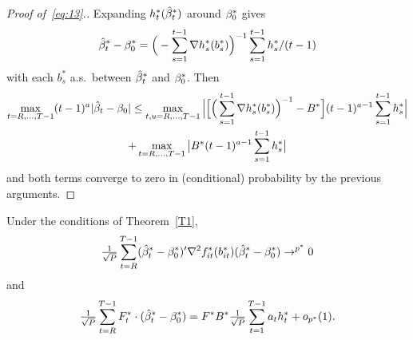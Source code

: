 \documentclass[12pt,fleqn]{article}
\begin{document}
\begin{proof}[Proof of~\eqref{eq:13}.]
Expanding $h_t^*(\hat \beta_t^*)$ around $\beta_0^*$ gives
\begin{equation*}
\hat \beta_t^* - \beta_0^* = \Big(- \sum_{s=1}^{t-1} \nabla h_s^*(b_s^*) \Big)^{-1} \sum_{s=1}^{t-1} h_s^* / (t-1)
\end{equation*}
with each $b_s^*$ a.s.\ between $\hat \beta_t^*$ and $\beta_0^*$. Then
\begin{multline}
  \max_{t=R,\dots,T-1} (t-1)^a | \hat{\beta}_t - \beta_0 |
  \leq
  \max_{t,u=R,\dots,T-1} \Big|\Big[ \Big(\sum_{s=1}^{t-1} \nabla h_s^*(b_s^*) \Big)^{-1} - B^* \Big]
  (t-1)^{a-1} \sum_{s=1}^{t-1} h_s^* \Big|\\
  + \max_{t=R,\dots,T-1} \big| B^*   (t-1)^{a-1} \sum_{s=1}^{t-1} h_s^* \big|
\end{multline}
and both terms converge to zero in (conditional) probability by the
previous arguments.
\end{proof}

\begin{lema}\label{SA4}
  Under the conditions of Theorem~\ref{T1},
  \begin{equation}\label{eq:16}
    \tfrac{1}{\sqrt{P}} \sum_{t=R}^{T-1} (\hat \beta_t^* - \beta_0^*)' \nabla^2 f_{it}^*(b_{it}^*) (\hat \beta_t^* - \beta_0^*) \to^{p^*} 0
  \end{equation}
  and
  \begin{equation}\label{eq:17}
    \tfrac{1}{\sqrt{P}} \sum_{t=R}^{T-1} F_t^* \cdot (\hat \beta_t^* - \beta_0^*)
    = F^* B^* \tfrac{1}{\sqrt{P}} \sum_{t=1}^{T-1} a_t h_t^* + o_{p^*}(1).
  \end{equation}
\end{lema}
\end{document}
